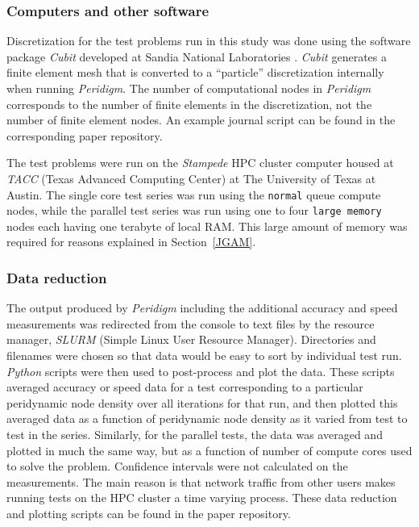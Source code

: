 \documentclass[preprint,12pt]{elsarticle}
\begin{document}
\subsubsection{Computers and other software} 
%
Discretization for the test problems run in this study was done using the software package \emph{Cubit} developed at Sandia National Laboratories \cite{ref-Cubit}. \emph{Cubit} generates a finite element mesh that is converted to a ``particle'' discretization internally when running \emph{Peridigm}. The number of computational nodes in \emph{Peridigm} corresponds to the number of finite elements in the discretization, not the number of finite element nodes.  An example journal script can be found in the corresponding paper repository. 

The test problems were run on the \emph{Stampede} HPC cluster computer housed at \emph{TACC} (Texas Advanced Computing Center) at The University of Texas at Austin. The single core test series was run using the {\tt normal} queue compute nodes, while the parallel test series was run using one to four {\tt large memory} nodes each having one terabyte of local RAM. This large amount of memory was required for reasons explained in Section~\ref{JGAM}.

\subsubsection{Data reduction} 
%
The output produced by \emph{Peridigm} including the additional accuracy and speed measurements was redirected from the console to text files by the resource manager, \emph{SLURM} (Simple Linux User Resource Manager).  Directories and filenames were chosen so that data would be easy to sort by individual test run.  \emph{Python} scripts were then used to post-process and plot the data. These scripts averaged accuracy or speed data for a test corresponding to a particular peridynamic node density over all iterations for that run, and then plotted this averaged data  as a function of peridynamic node density as it varied from test to test in the series.  Similarly, for the parallel tests, the data was averaged and plotted in much the same way, but as a function of number of compute cores used to solve the problem. Confidence intervals were not calculated on the measurements. The main reason is that network traffic from other users makes running tests on the HPC cluster a time varying process. These data reduction and plotting scripts can be found in the paper repository.
\end{document}
